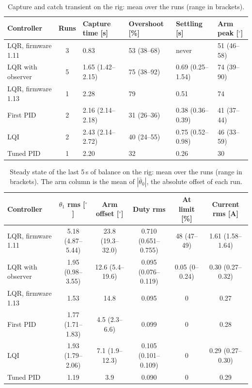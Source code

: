 \documentclass[a4paper,11pt]{article}
\begin{document}
\begin{table}[htbp]
\centering
\caption{Capture and catch transient on the rig: mean over the runs (range in brackets).}
\label{tab:cc_catch}
\footnotesize
\setlength{\tabcolsep}{3pt}
\begin{tabular}{@{}lcllll@{}}
\toprule
Controller & Runs & Capture time [s] & Overshoot [\%] & Settling [s] & Arm peak [$^\circ$] \\
\midrule
LQR, firmware 1.11 & 3 & 0.83 & 53 (38--68) & never & 51 (46--58) \\
LQR with observer & 5 & 1.65 (1.42--2.15) & 75 (38--92) & 0.69 (0.25--1.54) & 74 (39--90) \\
LQR, firmware 1.13 & 1 & 2.28 & 79 & 0.51 & 74 \\
First PID & 2 & 2.16 (2.14--2.18) & 31 (26--36) & 0.38 (0.36--0.39) & 41 (37--44) \\
LQI & 2 & 2.43 (2.14--2.72) & 40 (24--55) & 0.75 (0.52--0.98) & 46 (33--59) \\
Tuned PID & 1 & 2.20 & 32 & 0.26 & 30 \\
\bottomrule
\end{tabular}
\end{table}

\begin{table}[htbp]
\centering
\caption{Steady state of the last 5\,s of balance on the rig: mean over the runs (range in brackets). The arm column is the mean of $|\bar\theta_0|$, the absolute offset of each run.}
\label{tab:cc_steady}
\footnotesize
\setlength{\tabcolsep}{3pt}
\begin{tabular}{@{}lccccc@{}}
\toprule
Controller & $\theta_1$ rms [$^\circ$] & Arm offset [$^\circ$] & Duty rms & At limit [\%] & Current rms [A] \\
\midrule
LQR, firmware 1.11 & 5.18 (4.87--5.44) & 23.8 (19.3--32.0) & 0.710 (0.651--0.755) & 48 (47--49) & 1.61 (1.58--1.64) \\
LQR with observer & 1.95 (0.98--3.55) & 12.6 (5.4--19.6) & 0.095 (0.076--0.119) & 0.05 (0--0.24) & 0.30 (0.27--0.32) \\
LQR, firmware 1.13 & 1.53 & 14.8 & 0.095 & 0 & 0.27 \\
First PID & 1.77 (1.71--1.83) & 4.5 (2.3--6.6) & 0.099 & 0 & 0.28 \\
LQI & 1.93 (1.79--2.06) & 7.1 (1.9--12.3) & 0.105 (0.101--0.109) & 0 & 0.29 (0.27--0.30) \\
Tuned PID & 1.19 & 3.9 & 0.090 & 0 & 0.29 \\
\bottomrule
\end{tabular}
\end{table}
\end{document}
